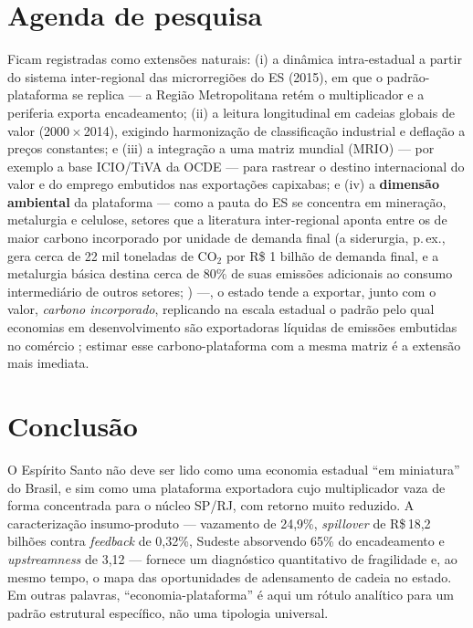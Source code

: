 \documentclass[11pt,a4paper]{article}
\begin{document}
\section{Agenda de pesquisa}
\label{sec:agenda}
Ficam registradas como extensões naturais: (i) a dinâmica intra-estadual a
partir do sistema inter-regional das microrregiões do ES (2015), em que o
padrão-plataforma se replica --- a Região Metropolitana retém o multiplicador
e a periferia exporta encadeamento; (ii) a leitura longitudinal em cadeias
globais de valor (2000\,$\times$\,2014), exigindo harmonização de classificação
industrial e deflação a preços constantes; e (iii) a integração a uma matriz
mundial (MRIO) --- por exemplo a base ICIO/TiVA da OCDE \citep{guilhoto2019exploring} ---
para rastrear o destino internacional do valor e do emprego
embutidos nas exportações capixabas; e (iv) a \textbf{dimensão ambiental} da
plataforma --- como a pauta do ES se concentra em mineração, metalurgia e celulose,
setores que a literatura inter-regional aponta entre os de maior carbono incorporado
por unidade de demanda final (a siderurgia, p.\,ex., gera cerca de 22 mil toneladas de
CO$_2$ por R\$ 1 bilhão de demanda final, e a metalurgia básica destina cerca de 80\%
de suas emissões adicionais ao consumo intermediário de outros setores;
\citealp{carvalho2009avaliacao}) ---, o estado tende a exportar, junto com o valor,
\emph{carbono incorporado}, replicando na escala estadual o padrão pelo qual economias
em desenvolvimento são exportadoras líquidas de emissões embutidas no comércio
\citep{yamano2020co2}; estimar esse carbono-plataforma com a mesma matriz é a extensão
mais imediata.

\section{Conclusão}
\label{sec:conclusao}
O Espírito Santo não deve ser lido como uma economia estadual ``em miniatura''
do Brasil, e sim como uma plataforma exportadora cujo multiplicador vaza de
forma concentrada para o núcleo SP/RJ, com retorno muito reduzido. A
caracterização insumo-produto --- vazamento de 24,9\%, \emph{spillover} de
R\$\,18,2 bilhões contra \emph{feedback} de 0,32\%, Sudeste absorvendo 65\% do
encadeamento e \emph{upstreamness} de 3,12 --- fornece um diagnóstico
quantitativo de fragilidade e, ao mesmo tempo, o mapa das oportunidades de
adensamento de cadeia no estado. Em outras palavras, ``economia-plataforma''
é aqui um rótulo analítico para um padrão estrutural específico, não uma
tipologia universal.
\end{document}
